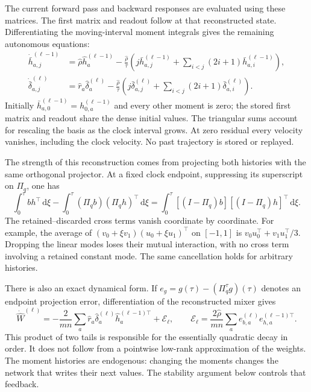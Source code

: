 The current forward pass and backward responses are evaluated using these
matrices. The first matrix and readout follow  at that
reconstructed state. Differentiating the moving-interval moment integrals
gives the remaining autonomous equations:
\begin{equation}
 \begin{aligned}
 \dot{\bar h}_{a,j}^{(\ell-1)}
 &=\widehat\rho\widehat h_a^{(\ell-1)}
 -\frac{\widehat\rho}{\tau}
 \left(j\bar h_{a,j}^{(\ell-1)}
       +\sum_{i<j}(2i+1)\bar h_{a,i}^{(\ell-1)}\right),\\
 \dot{\bar\delta}_{a,j}^{(\ell)}
 &=\widehat r_a\widehat\delta_a^{(\ell)}
 -\frac{\widehat\rho}{\tau}
 \left(j\bar\delta_{a,j}^{(\ell)}
       +\sum_{i<j}(2i+1)\bar\delta_{a,i}^{(\ell)}\right).
 \end{aligned}
 \label{eq:methods-legendre-moments}
\end{equation}
Initially $\bar h_{a,0}^{(\ell-1)}=h_{0,a}^{(\ell-1)}$ and every other
moment is zero; the stored first matrix and readout share the dense initial
values. The triangular sums account for rescaling the basis as the
clock interval grows. At zero residual every velocity vanishes, including
the clock velocity. No past trajectory is stored or replayed.

The strength of this reconstruction comes from projecting both histories
with the same orthogonal projector. At a fixed clock endpoint, suppressing
its superscript on $\Pi_q$, one has
\begin{equation}
 \int_0^\tau bh^\top\,\mathrm d\xi
 -\int_0^\tau(\Pi_qb)(\Pi_qh)^\top\,\mathrm d\xi
 =\int_0^\tau[(I-\Pi_q)b][(I-\Pi_q)h]^\top\,\mathrm d\xi.
 \label{eq:methods-legendre-tail-pairing}
\end{equation}
The retained--discarded cross terms vanish coordinate by coordinate.
For example, the average of $(v_0+\xi v_1)(u_0+\xi u_1)^\top$ on
$[-1,1]$ is $v_0u_0^\top+v_1u_1^\top/3$. Dropping the linear modes
loses their mutual interaction, with no cross term involving a retained
constant mode. The same cancellation holds for arbitrary histories.

There is also an exact dynamical form. If
$e_g=g(\tau)-(\Pi_q^\tau g)(\tau)$ denotes an endpoint projection
error, differentiation of the reconstructed mixer gives
\begin{equation}
 \dot{\widehat W}^{(\ell)}
 =-\frac2{mn}\sum_a\widehat r_a\widehat\delta_a^{(\ell)}
       \widehat h_a^{(\ell-1)\top}+\mathcal E_\ell,
 \qquad
 \mathcal E_\ell=\frac{2\widehat\rho}{mn}
       \sum_a e_{b,a}^{(\ell)}e_{h,a}^{(\ell-1)\top}.
 \label{eq:methods-legendre-defect}
\end{equation}
This product of two tails is responsible for the essentially quadratic
decay in order. It does not follow from a pointwise low-rank approximation
of the weights. The moment histories are endogenous: changing the moments
changes the network that writes their next values. The stability argument
below controls that feedback.


